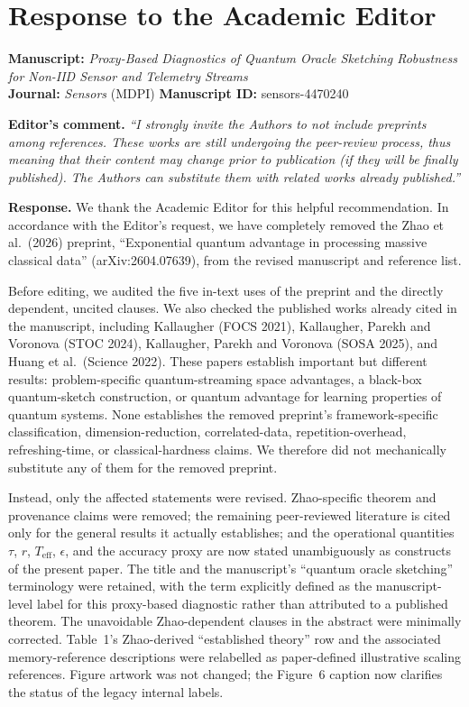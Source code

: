 \documentclass[11pt]{article}
\begin{document}
\section*{Response to the Academic Editor}

\textbf{Manuscript:} \emph{Proxy-Based Diagnostics of Quantum Oracle Sketching Robustness for Non-IID Sensor and Telemetry Streams}\\
\textbf{Journal:} \emph{Sensors} (MDPI) \textperiodcentered{} \textbf{Manuscript ID:} sensors-4470240

\textbf{Editor's comment.} \emph{``I strongly invite the Authors to not include preprints among references. These works are still undergoing the peer-review process, thus meaning that their content may change prior to publication (if they will be finally published). The Authors can substitute them with related works already published.''}

\textbf{Response.} We thank the Academic Editor for this helpful recommendation. In accordance with the Editor's request, we have completely removed the Zhao et al.\ (2026) preprint, ``Exponential quantum advantage in processing massive classical data'' (arXiv:2604.07639), from the revised manuscript and reference list.

Before editing, we audited the five in-text uses of the preprint and the directly dependent, uncited clauses. We also checked the published works already cited in the manuscript, including Kallaugher (FOCS 2021), Kallaugher, Parekh and Voronova (STOC 2024), Kallaugher, Parekh and Voronova (SOSA 2025), and Huang et al.\ (Science 2022). These papers establish important but different results: problem-specific quantum-streaming space advantages, a black-box quantum-sketch construction, or quantum advantage for learning properties of quantum systems. None establishes the removed preprint's framework-specific classification, dimension-reduction, correlated-data, repetition-overhead, refreshing-time, or classical-hardness claims. We therefore did not mechanically substitute any of them for the removed preprint.

Instead, only the affected statements were revised. Zhao-specific theorem and provenance claims were removed; the remaining peer-reviewed literature is cited only for the general results it actually establishes; and the operational quantities $\tau$, $r$, $T_{\mathrm{eff}}$, $\epsilon$, and the accuracy proxy are now stated unambiguously as constructs of the present paper. The title and the manuscript's ``quantum oracle sketching'' terminology were retained, with the term explicitly defined as the manuscript-level label for this proxy-based diagnostic rather than attributed to a published theorem. The unavoidable Zhao-dependent clauses in the abstract were minimally corrected. Table~1's Zhao-derived ``established theory'' row and the associated memory-reference descriptions were relabelled as paper-defined illustrative scaling references. Figure artwork was not changed; the Figure~6 caption now clarifies the status of the legacy internal labels.
\end{document}
